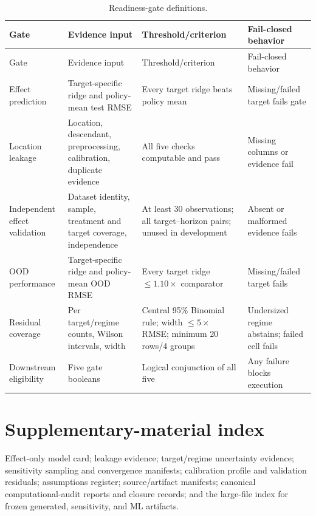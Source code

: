 \documentclass[11pt]{article}
\begin{document}
\begin{longtable}{P{0.18\textwidth}P{0.25\textwidth}P{0.22\textwidth}P{0.16\textwidth}}
\caption{Readiness-gate definitions.}\label{tab:gate-methods}\\
\toprule Gate & Evidence input & Threshold/criterion & Fail-closed behavior \\
\midrule\endfirsthead
\toprule Gate & Evidence input & Threshold/criterion & Fail-closed behavior \\
\midrule\endhead
Effect prediction & Target-specific ridge and policy-mean test RMSE & Every target ridge beats policy mean & Missing/failed target fails gate \\
Location leakage & Location, descendant, preprocessing, calibration, duplicate evidence & All five checks computable and pass & Missing columns or evidence fail \\
Independent effect validation & Dataset identity, sample, treatment and target coverage, independence & At least 30 observations; all target--horizon pairs; unused in development & Absent or malformed evidence fails \\
OOD performance & Target-specific ridge and policy-mean OOD RMSE & Every target ridge $\leq1.10\times$ comparator & Missing/failed target fails \\
Residual coverage & Per target/regime counts, Wilson intervals, width & Central 95\% Binomial rule; width $\leq5\times$ RMSE; minimum 20 rows/4 groups & Undersized regime abstains; failed cell fails \\
Downstream eligibility & Five gate booleans & Logical conjunction of all five & Any failure blocks execution \\
\bottomrule
\end{longtable}

\section{Supplementary-material index}
Effect-only model card; leakage evidence; target/regime uncertainty evidence; sensitivity sampling and convergence manifests; calibration profile and validation residuals; assumptions register; source/artifact manifests; canonical computational-audit reports and closure records; and the large-file index for frozen generated, sensitivity, and ML artifacts.
\end{document}
